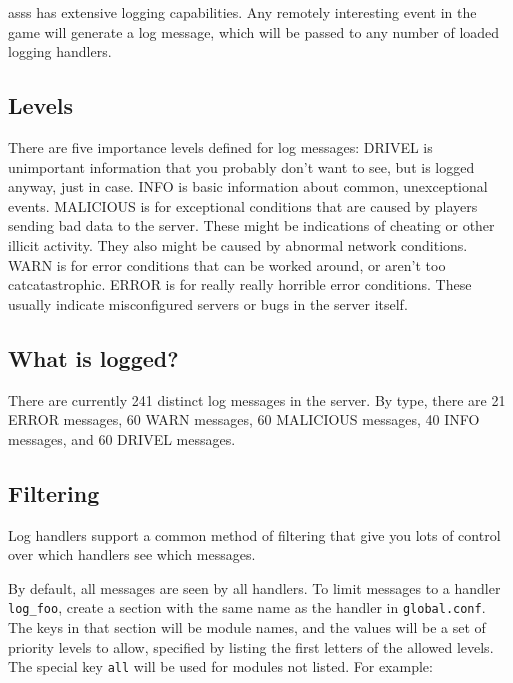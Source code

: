\documentclass{article}
\newcommand{\asss}{asss}
\begin{document}
\asss{} has extensive logging capabilities. Any remotely interesting
event in the game will generate a log message, which will be passed to
any number of loaded logging handlers.

\subsection{Levels}

There are five importance levels defined for log messages: DRIVEL is
unimportant information that you probably don't want to see, but is
logged anyway, just in case. INFO is basic information about common,
unexceptional events. MALICIOUS is for exceptional conditions that are
caused by players sending bad data to the server. These might be
indications of cheating or other illicit activity. They also might be
caused by abnormal network conditions. WARN is for error conditions that
can be worked around, or aren't too catcatastrophic. ERROR is for really
really horrible error conditions. These usually indicate misconfigured
servers or bugs in the server itself.

\subsection{What is logged?}

There are currently
241
distinct log messages in the server. By type, there are 21 ERROR
messages, 60 WARN messages, 60 MALICIOUS messages, 40 INFO messages, and
60 DRIVEL messages.

\subsection{Filtering}

Log handlers support a common method of filtering that give you lots of
control over which handlers see which messages.

By default, all messages are seen by all handlers. To limit messages to
a handler \verb/log_foo/, create a section with the same name as the
handler in \verb/global.conf/. The keys in that section will be module
names, and the values will be a set of priority levels to allow,
specified by listing the first letters of the allowed levels. The
special key \verb/all/ will be used for modules not listed. For example:
\end{document}

